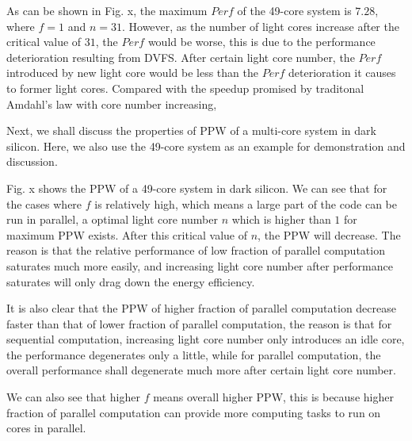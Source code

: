 As can be shown in Fig. x, the maximum $Perf$ of the 49-core system is $7.28$, where $f = 1$ and $n = 31$. However, as the number of light cores increase after the critical value of $31$, the $Perf$ would be worse, this is due to the performance deterioration resulting from DVFS. After certain light core number, the $Perf$ introduced by new light core would be less than the $Perf$ deterioration it causes to former light cores. Compared with the speedup promised by traditonal Amdahl's law with core number increasing, 

Next, we shall discuss the properties of PPW of a multi-core system in dark silicon. Here, we also use the 49-core system as an example for demonstration and discussion.

Fig. x shows the PPW of a 49-core system in dark silicon. We can see that for the cases where $f$ is relatively high, which means a large part of the code can be run in parallel, a optimal light core number $n$ which is higher than $1$ for maximum PPW exists. After this critical value of $n$, the PPW will decrease. The reason is that the relative performance of low fraction of parallel computation saturates much more easily, and increasing light core number after performance saturates will only drag down the energy efficiency.

It is also clear that the PPW of higher fraction of parallel computation decrease faster than that of lower fraction of parallel computation, the reason is that for sequential computation, increasing light core number only introduces an idle core, the performance degenerates only a little, while for parallel computation, the overall performance shall degenerate much more after certain light core number.

We can also see that higher $f$ means overall higher PPW, this is because higher fraction of parallel computation can provide more computing tasks to run on cores in parallel.
